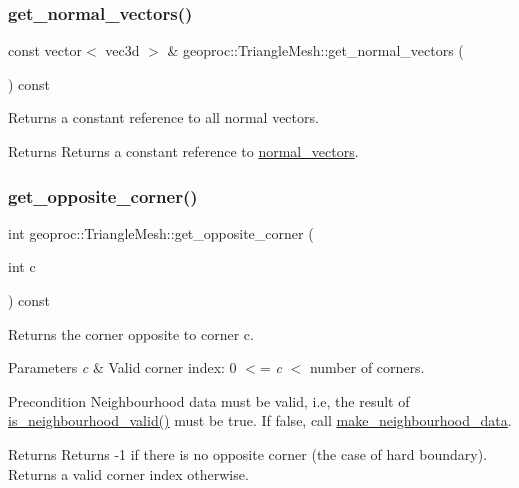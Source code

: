 \subsubsection{\texorpdfstring{get\+\_\+normal\+\_\+vectors()}{get\_normal\_vectors()}}
{\footnotesize\ttfamily const vector$<$ vec3d $>$ \& geoproc\+::\+Triangle\+Mesh\+::get\+\_\+normal\+\_\+vectors (\begin{DoxyParamCaption}{ }\end{DoxyParamCaption}) const}



Returns a constant reference to all normal vectors. 

\begin{DoxyReturn}{Returns}
Returns a constant reference to \hyperlink{classgeoproc_1_1TriangleMesh_a9fa270e81bcf0b9acf03696d9d0c9264}{normal\+\_\+vectors}. 
\end{DoxyReturn}
\mbox{\label{classgeoproc_1_1TriangleMesh_a0ea38352c56a76d6def1fce67253f433}} 
\subsubsection{\texorpdfstring{get\+\_\+opposite\+\_\+corner()}{get\_opposite\_corner()}}
{\footnotesize\ttfamily int geoproc\+::\+Triangle\+Mesh\+::get\+\_\+opposite\+\_\+corner (\begin{DoxyParamCaption}\item[{int}]{c }\end{DoxyParamCaption}) const}



Returns the corner opposite to corner c. 


\begin{DoxyParams}{Parameters}
{\em c} & Valid corner index\+: 0 $<$= {\itshape c} $<$ number of corners. \\
\hline
\end{DoxyParams}
\begin{DoxyPrecond}{Precondition}
Neighbourhood data must be valid, i.\+e, the result of \hyperlink{classgeoproc_1_1TriangleMesh_aa6f95b95709a72a14a15638bfeeed3f9}{is\+\_\+neighbourhood\+\_\+valid()} must be true. If false, call \hyperlink{classgeoproc_1_1TriangleMesh_a84003dfdfd5e591c00f01a797578ff1f}{make\+\_\+neighbourhood\+\_\+data}. 
\end{DoxyPrecond}
\begin{DoxyReturn}{Returns}
Returns -\/1 if there is no opposite corner (the case of hard boundary). Returns a valid corner index otherwise. 
\end{DoxyReturn}
\mbox{\label{classgeoproc_1_1TriangleMesh_acf65055f93899ce43308655fcc4d84b4}} 
